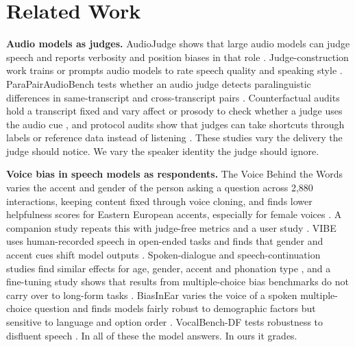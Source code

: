 \section{Related Work}
\label{sec:related}

\textbf{Audio models as judges.} AudioJudge shows that large audio models can judge speech and reports verbosity and position biases in that role \citep{manakul2025audiojudgeun}. Judge-construction work trains or prompts audio models to rate speech quality and speaking style \citep{wang2025speechllmasj,zhang2026jastinaligni,chen2025audiolargela,chiang2025audioawarela}. ParaPairAudioBench tests whether an audio judge detects paralinguistic differences in same-transcript and cross-transcript pairs \citep{jeon2026parapairaudi}. Counterfactual audits hold a transcript fixed and vary affect or prosody to check whether a judge uses the audio cue \citep{miller2026doaudiolangu}, and protocol audits show that judges can take shortcuts through labels or reference data instead of listening \citep{park2026auditingprot}. These studies vary the delivery the judge should notice. We vary the speaker identity the judge should ignore.

\textbf{Voice bias in speech models as respondents.} The Voice Behind the Words varies the accent and gender of the person asking a question across 2,880 interactions, keeping content fixed through voice cloning, and finds lower helpfulness scores for Eastern European accents, especially for female voices \citep{satish2026thevoicebehi}. A companion study repeats this with judge-free metrics and a user study \citep{satish2026fromseeingit}. VIBE uses human-recorded speech in open-ended tasks and finds that gender and accent cues shift model outputs \citep{lin2026vibevoiceind}. Spoken-dialogue and speech-continuation studies find similar effects for age, gender, accent and phonation type \citep{wu2025evaluatingbi,satish2025speakyourmin,choi2025acousticbase}, and a fine-tuning study shows that results from multiple-choice bias benchmarks do not carry over to long-form tasks \citep{satish2025dobiasbenchm}. BiasInEar varies the voice of a spoken multiple-choice question and finds models fairly robust to demographic factors but sensitive to language and option order \citep{wei2026biasintheear}. VocalBench-DF tests robustness to disfluent speech \citep{liu2025vocalbenchdf}. In all of these the model answers. In ours it grades.

